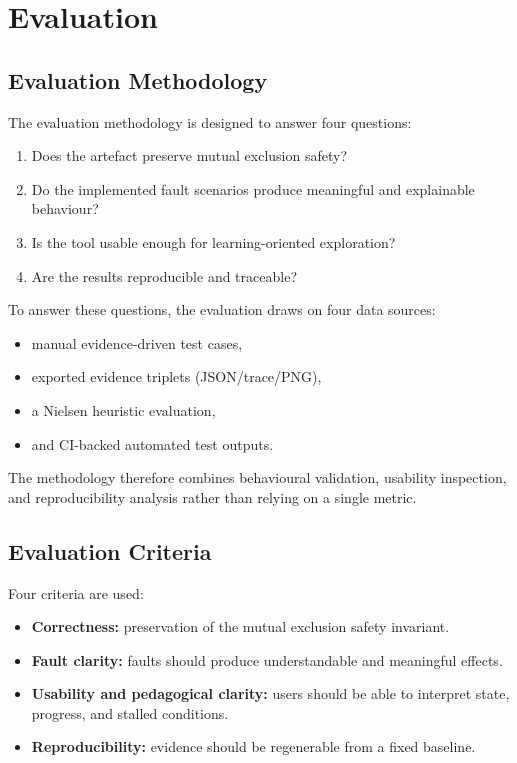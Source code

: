\chapter{Evaluation}
\label{ch:evaluation}

\section{Evaluation Methodology}
The evaluation methodology is designed to answer four questions:
\begin{enumerate}
  \item Does the artefact preserve mutual exclusion safety?
  \item Do the implemented fault scenarios produce meaningful and explainable behaviour?
  \item Is the tool usable enough for learning-oriented exploration?
  \item Are the results reproducible and traceable?
\end{enumerate}

To answer these questions, the evaluation draws on four data sources:
\begin{itemize}
  \item manual evidence-driven test cases,
  \item exported evidence triplets (JSON/trace/PNG),
  \item a Nielsen heuristic evaluation,
  \item and CI-backed automated test outputs.
\end{itemize}

The methodology therefore combines behavioural validation, usability inspection, and reproducibility analysis rather than relying on a single metric.

\section{Evaluation Criteria}
Four criteria are used:
\begin{itemize}
  \item \textbf{Correctness:} preservation of the mutual exclusion safety invariant.
  \item \textbf{Fault clarity:} faults should produce understandable and meaningful effects.
  \item \textbf{Usability and pedagogical clarity:} users should be able to interpret state, progress, and stalled conditions.
  \item \textbf{Reproducibility:} evidence should be regenerable from a fixed baseline.
\end{itemize}

